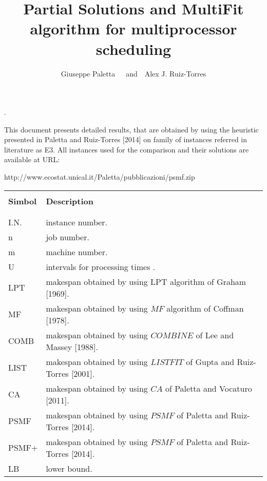 \documentclass[12pt,a4paper]{article}
\title{\bf
Partial Solutions and MultiFit algorithm for multiprocessor
scheduling}
\author{Giuseppe Paletta\footnotemark[1]~~~and~~Alex J. Ruiz-Torres \footnotemark[2]}
\begin{document}
\maketitle

\renewcommand{\thefootnote}{\fnsymbol{footnote}}

. 
\renewcommand{\thefootnote}{\fnsymbol{footnote}}

This document presents detailed results, that are obtained by using
the heuristic presented in Paletta and Ruiz-Torres [2014] on family
of instances referred in literature as E3. All instances used for
the comparison and their solutions are available at URL:
\begin{center}
http://www.ecostat.unical.it/Paletta/pubblicazioni/psmf.zip
\end{center}

\begin{tabular}{l l}\hline
        &  \\[0.03in]
{\bf Simbol} &  {\bf Description} \\[0.03in]
        &  \\[0.03in]\hline
        &  \\[0.03in]
I.N.  & instance number. \\[0.03in]
n       & job number.    \\[0.03in]
m       & machine number. \\[0.03in]
U       & intervals for processing times . \\[0.03in]
LPT      & makespan obtained by using LPT algorithm of Graham [1969]. \\[0.03in]
MF      & makespan obtained by using $MF$ algorithm of Coffman [1978].\\[0.03in]
COMB      & makespan obtained by using $COMBINE$ of Lee and Massey [1988]. \\[0.03in]
LIST      & makespan obtained by using $LISTFIT$ of Gupta and Ruiz-Torres [2001]. \\[0.03in]
CA      & makespan obtained by using  $CA$ of Paletta and Vocaturo [2011].\\[0.03in]
PSMF      & makespan obtained by using  $PSMF$ of Paletta and Ruiz-Torres [2014]. \\[0.03in]
PSMF+     & makespan obtained by using $PSMF$ of Paletta and Ruiz-Torres [2014]. \\[0.03in]
LB      & lower bound. \\[0.03in]

\end{tabular}
\end{document}

